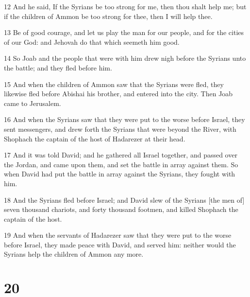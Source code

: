 \par 12 And he said, If the Syrians be too strong for me, then thou shalt help me; but if the children of Ammon be too strong for thee, then I will help thee.
\par 13 Be of good courage, and let us play the man for our people, and for the cities of our God: and Jehovah do that which seemeth him good.
\par 14 So Joab and the people that were with him drew nigh before the Syrians unto the battle; and they fled before him.
\par 15 And when the children of Ammon saw that the Syrians were fled, they likewise fled before Abishai his brother, and entered into the city. Then Joab came to Jerusalem.
\par 16 And when the Syrians saw that they were put to the worse before Israel, they sent messengers, and drew forth the Syrians that were beyond the River, with Shophach the captain of the host of Hadarezer at their head.
\par 17 And it was told David; and he gathered all Israel together, and passed over the Jordan, and came upon them, and set the battle in array against them. So when David had put the battle in array against the Syrians, they fought with him.
\par 18 And the Syrians fled before Israel; and David slew of the Syrians [the men of] seven thousand chariots, and forty thousand footmen, and killed Shophach the captain of the host.
\par 19 And when the servants of Hadarezer saw that they were put to the worse before Israel, they made peace with David, and served him: neither would the Syrians help the children of Ammon any more.

\chapter{20}

